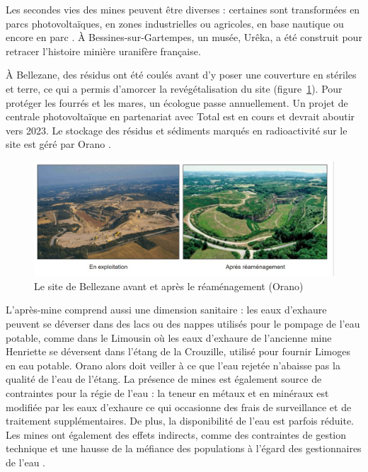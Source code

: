 \documentclass{article}
\begin{document}
Les secondes vies des mines peuvent être diverses : certaines sont transformées en parcs photovoltaïques, en zones industrielles ou agricoles, en base nautique ou encore en parc \cite{himeur_apres-mine_2020}. À Bessines-sur-Gartempes, un musée, Urêka, a été construit pour retracer l'histoire minière uranifère française.

À Bellezane, des résidus ont été coulés avant d’y poser une couverture en stériles et terre, ce qui a permis d'amorcer la revégétalisation du site (figure~\ref{fig:bellezane_avant_apres}). Pour protéger les fourrés et les mares, un écologue passe annuellement. Un projet de centrale photovoltaïque en partenariat avec Total est en cours et devrait aboutir vers 2023. Le stockage des résidus et sédiments marqués en radioactivité sur le site est géré par Orano \cite{benesteau_site_2020}.

\begin{figure}[H]
    \centering
    \includegraphics[width=\textwidth]{I_B_2.jpg}
    \caption{Le site de Bellezane avant et après le réaménagement (Orano)}
    \label{fig:bellezane_avant_apres}
\end{figure}

L’après-mine comprend aussi une dimension sanitaire : les eaux d’exhaure peuvent se déverser dans des lacs ou des nappes utilisés pour le pompage de l’eau potable, comme dans le Limousin où les eaux d'exhaure de l'ancienne mine Henriette se déversent dans l'étang de la Crouzille, utilisé pour fournir Limoges en eau potable. Orano alors doit veiller à ce que l'eau rejetée n'abaisse pas la qualité de l'eau de l'étang. La présence de mines est également source de contraintes pour la régie de l’eau : la teneur en métaux et en minéraux est modifiée par les eaux d’exhaure ce qui occasionne des frais de surveillance et de traitement supplémentaires. De plus, la disponibilité de l’eau est parfois réduite. Les mines ont également des effets indirects, comme des contraintes de gestion technique et une hausse de la méfiance des populations à l’égard des gestionnaires de l’eau \cite{vialleseche_station_2020}.
\end{document}
